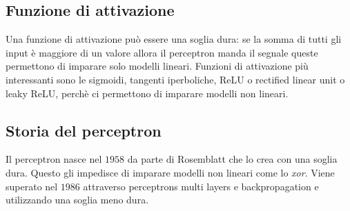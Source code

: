 	\subsection{Funzione di attivazione}
	Una funzione di attivazione pu\`o essere una soglia dura: se la somma di tutti gli input \`e maggiore di un valore allora il perceptron manda il segnale queste permettono di imparare solo modelli lineari.
	Funzioni di attivazione pi\`u interessanti sono le sigmoidi, tangenti iperboliche, ReLU o rectified linear unit o leaky ReLU, perch\`e ci permettono di imparare modelli non lineari.

	\subsection{Storia del perceptron}
	Il perceptron nasce nel $1958$ da parte di Rosemblatt che lo crea con una soglia dura.
	Questo gli impedisce di imparare modelli non lineari come lo \emph{xor}.
	Viene superato nel $1986$ attraverso perceptrons multi layers e backpropagation e utilizzando una soglia meno dura.
